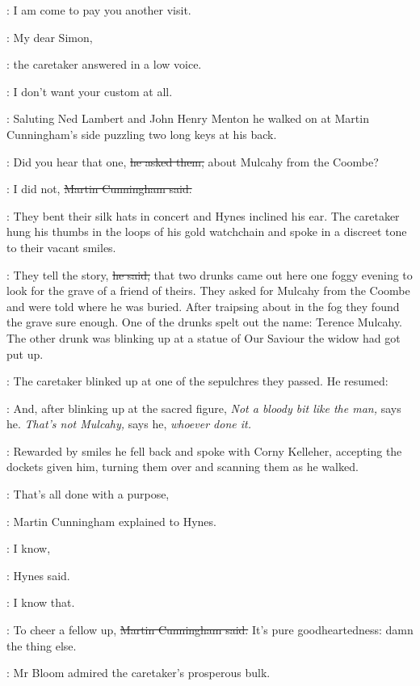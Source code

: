 \simon:
I am come to pay you another visit.

\oconnell:
My dear Simon,

:
the caretaker answered in a low voice.

\oconnell:
I don't want your custom at all.

:
Saluting Ned Lambert and John Henry Menton
he walked on at Martin Cunningham's side
puzzling two long keys at his back.

\oconnell:
Did you hear that one,
\sout{he asked them,}
about Mulcahy from the Coombe?

\cunningham:
I did not,
\sout{Martin Cunningham said.}

:
They bent their silk hats in concert and Hynes inclined his ear.
The caretaker hung his thumbs in the loops of his gold watchchain
and spoke in a discreet tone to their vacant smiles.

\oconnell:
They tell the story,
\sout{he said,}
that two drunks came out here one foggy evening
to look for the grave of a friend of theirs.
They asked for Mulcahy from the Coombe and were told where he was buried.
After traipsing about in the fog they found the grave sure enough.
One of the drunks spelt out the name:
Terence Mulcahy.
The other drunk was blinking up at a statue of Our Saviour
the widow had got put up.

:
The caretaker blinked up at one of the sepulchres they passed.
He resumed:

\oconnell:
And, after blinking up at the sacred figure,
\emph{Not a bloody bit like the man,} says he.
\emph{That's not Mulcahy,} says he,
\emph{whoever done it.}

:
Rewarded by smiles
he fell back and spoke with Corny Kelleher,
accepting the dockets given him,
turning them over and scanning them as he walked.

\cunningham:
That's all done with a purpose,

:
Martin Cunningham explained to Hynes.

\hynes:
I know,

:
Hynes said.

\hynes:
I know that.

\cunningham:
To cheer a fellow up,
\sout{Martin Cunningham said.}
It's pure goodheartedness:
damn the thing else.

:
Mr Bloom admired the caretaker's prosperous bulk.

